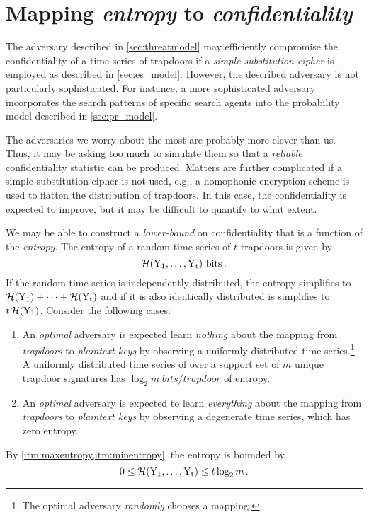 \documentclass[ ../main.tex]{subfiles}
\begin{document}
\section{Mapping \emph{entropy} to \emph{confidentiality}}
\label{sec:sophisticated}
The adversary described in \cref{sec:threatmodel} may efficiently compromise the confidentiality of a time series of trapdoors if a \emph{simple substitution cipher} is employed as described in \cref{sec:es_model}. However, the described adversary is not particularly sophisticated. For instance, a more sophisticated adversary incorporates the search patterns of specific search agents into the probability model described in \cref{sec:pr_model}.

The adversaries we worry about the most are probably more clever than us. Thus, it may be asking too much to simulate them so that a \emph{reliable} confidentiality statistic can be produced. Matters are further complicated if a simple substitution cipher is not used, e.g., a homophonic encryption scheme is used to flatten the distribution of trapdoors. In this case, the confidentiality is expected to improve, but it may be difficult to quantify to what extent.

We may be able to construct a \emph{lower-bound} on confidentiality that is a function of the \emph{entropy}. The entropy of a random time series of $t$ trapdoors is given by
\begin{equation}
    \entropy\!\left(\rv{Y_1},\ldots,\rv{Y_t}\right)\, \si{bits}\,.
\end{equation}
If the random time series is independently distributed, the entropy simplifies to $\entropy\!\left(\rv{Y_1}\right) + \cdots + \entropy\!\left(\rv{Y_t}\right)$ and if it is also identically distributed is simplifies to $t \entropy\!\left(\rv{Y_1}\right)$. Consider the following cases:
\begin{enumerate}
    \item
    \label{itm:maxentropy}
    An \emph{optimal} adversary is expected learn \emph{nothing} about the mapping from \emph{trapdoors} to \emph{plaintext keys} by observing a uniformly distributed time series.\footnote{The optimal adversary \emph{randomly} chooses a mapping.} A uniformly distributed time series of over a support set of $m$ unique trapdoor signatures has $\log_2 m \; \si{bits \per trapdoor}$ of entropy.
    
    \item
    \label{itm:minentropy}
    An \emph{optimal} adversary is expected to learn \emph{everything} about the mapping from \emph{trapdoors} to \emph{plaintext keys} by observing a degenerate time series, which has zero entropy.
\end{enumerate}
By \cref{itm:maxentropy,itm:minentropy}, the entropy is bounded by
\begin{equation}
    0 \leq \entropy\!\left(\rv{Y_1},\ldots,\rv{Y_t}\right) \leq t \log_2 m\,.
\end{equation}
\end{document}

